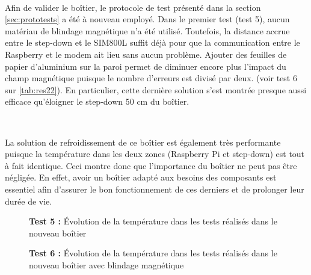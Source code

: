 ~

\noindent
Afin de valider le boîtier, le protocole de test présenté dans la section \ref{sec:prototests} a été à nouveau employé. Dans le premier test (test 5), aucun matériau de blindage magnétique n’a été utilisé. Toutefois, la distance accrue entre le step-down et le SIM800L suffit déjà pour que la communication entre le Raspberry et le modem ait lieu sans aucun problème. Ajouter des feuilles de papier d’aluminium sur la paroi permet de diminuer encore plus l’impact du champ magnétique puisque le nombre d’erreurs est divisé par deux. (voir test 6 sur \ref{tab:res22}). En particulier, cette dernière solution s’est montrée presque aussi efficace qu’éloigner le step-down 50 cm du boîtier.

~

\noindent
La solution de refroidissement de ce boîtier est également très performante puisque la température dans les deux zones (Raspberry Pi et step-down) est tout à fait identique. Ceci montre donc que l’importance du boîtier ne peut pas être négligée. En effet, avoir un boîtier adapté aux besoins des composants est essentiel afin d’assurer le bon fonctionnement de ces derniers et de prolonger leur durée de vie.


\begin{figure}[ht!]
  \centering
  
  \label{fig:test_5}
  \vspace{-0.2cm}
  \caption{\textbf{Test 5 :} Évolution de la température dans les tests réalisés dans le nouveau boîtier}
\end{figure}


\begin{figure}[ht!]
  \centering
  
  \label{fig:test_5}
  \vspace{-1cm}
  \caption{\textbf{Test 6 :} Évolution de la température dans les tests réalisés dans le nouveau boîtier avec blindage magnétique}
\end{figure}


